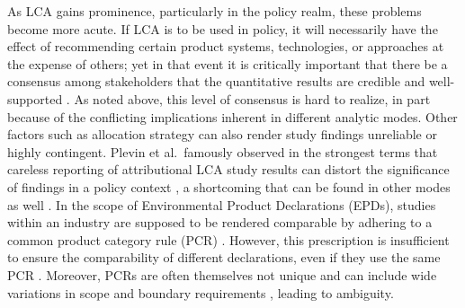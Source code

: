 As LCA gains prominence, particularly in the policy realm, these problems become more acute.  If LCA is to be used in policy, it will necessarily have the effect of recommending certain product systems, technologies, or approaches at the expense of others; yet in that event it is critically important that there be a consensus among stakeholders that the quantitative results are credible and well-supported \citep{Rainville_2015, McManus_2015}.  As noted above, this level of consensus is hard to realize, in part because of the conflicting implications inherent in different analytic modes.
Other factors such as allocation strategy \citep{Pelletier_2014} can also render study findings unreliable or highly contingent.  Plevin et al.\ famously observed in the strongest terms that careless reporting of attributional LCA study results can distort the significance of findings in a policy context \citep{Plevin_2013}, a shortcoming that can be found in other modes as well \citep{Brandao_2014}.  In the scope of Environmental Product Declarations (EPDs), studies within an industry are supposed to be rendered comparable by adhering to a common product category rule (PCR) \citep{Fet_2006}.  However, this prescription is insufficient to ensure the comparability of different declarations, even if they use the same PCR \citep{Modahl_2012}.  Moreover, PCRs are often themselves not unique and can include wide variations in scope and boundary requirements \citep{Subramanian_2012}, leading to ambiguity.  

\endinput

Some thoughts to put together and rearrange:

 * The task of computing life cycle impact assessment (LCIA) results from a product system model is often described as an ``aggregation,'' in which the data in large, sparse models are combined through linear algebra operations into a small set of numeric scores.  
 
 * In the process of aggregating the models, much of the information about their construction is lost.  This is partly by design, in order to protect the privacy of the input data \citep[Ch. 3]{UNEP_2011}.




 * However, that same feature is also a shortcoming when considered from the perspective of study transparency, replication, and extension.  


 * Although several equivalent methods for computing aggregated LCI and/or LCIA results have been described in the literature (Suh 2005; Lenzen 2007), the computational representation of product system models, and the generation of aggregated results, remains steadfastly software-specific.




